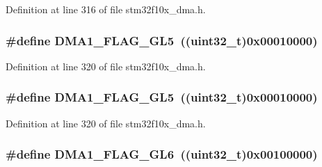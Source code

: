 Definition at line 316 of file stm32f10x\+\_\+dma.\+h.

\subsubsection[{\texorpdfstring{D\+M\+A1\+\_\+\+F\+L\+A\+G\+\_\+\+G\+L5}{DMA1_FLAG_GL5}}]{\setlength{\rightskip}{0pt plus 5cm}\#define D\+M\+A1\+\_\+\+F\+L\+A\+G\+\_\+\+G\+L5~(({\bf uint32\+\_\+t})0x00010000)}\hypertarget{group___d_m_a__flags__definition_ga173d8dadcbf3d96911a43eedf53bd64e}{}\label{group___d_m_a__flags__definition_ga173d8dadcbf3d96911a43eedf53bd64e}


Definition at line 320 of file stm32f10x\+\_\+dma.\+h.

\subsubsection[{\texorpdfstring{D\+M\+A1\+\_\+\+F\+L\+A\+G\+\_\+\+G\+L5}{DMA1_FLAG_GL5}}]{\setlength{\rightskip}{0pt plus 5cm}\#define D\+M\+A1\+\_\+\+F\+L\+A\+G\+\_\+\+G\+L5~(({\bf uint32\+\_\+t})0x00010000)}\hypertarget{group___d_m_a__flags__definition_ga173d8dadcbf3d96911a43eedf53bd64e}{}\label{group___d_m_a__flags__definition_ga173d8dadcbf3d96911a43eedf53bd64e}


Definition at line 320 of file stm32f10x\+\_\+dma.\+h.

\subsubsection[{\texorpdfstring{D\+M\+A1\+\_\+\+F\+L\+A\+G\+\_\+\+G\+L6}{DMA1_FLAG_GL6}}]{\setlength{\rightskip}{0pt plus 5cm}\#define D\+M\+A1\+\_\+\+F\+L\+A\+G\+\_\+\+G\+L6~(({\bf uint32\+\_\+t})0x00100000)}\hypertarget{group___d_m_a__flags__definition_gab21d0196f89435f61bedd03d53edc093}{}\label{group___d_m_a__flags__definition_gab21d0196f89435f61bedd03d53edc093}


